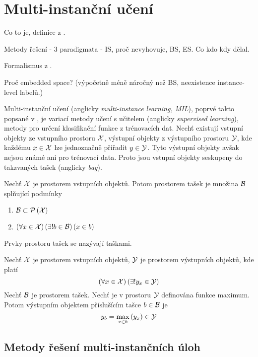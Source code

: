 \chapter{Multi-instanční učení}

Co to je, definice z \cite{dietterich_solving_1997}.

Metody řešení - 3 paradigmata - IS, proč nevyhovuje, BS, ES. Co kdo kdy dělal.

Formalismus z \cite{pevny_using_2016}.

Proč embedded space? (výpočetně méně náročný než BS, neexistence instance-level labelů.)

Multi-instanční učení (anglicky \textenglish{\textit{multi-instance learning, MIL}}), poprvé takto popsané v \cite{dietterich_solving_1997}, je variací metody učení s učitelem (anglicky \textenglish{\textit{supervised learning}}), metody pro určení klasifikační funkce z trénovacích dat. Nechť existují vstupní objekty ze vstupního prostoru \( \mathcal X \), výstupní objekty z výstupního prostoru \( \mathcal Y \), kde každému \( x \in \mathcal X \) lze jednoznačně přiřadit \( y \in \mathcal Y \). Tyto výstupní objekty avšak nejsou známé ani pro trénovací data. Proto jsou vstupní objekty seskupeny do takzvaných tašek (anglicky \textenglish{\textit{bag}}).
\begin{define}
	Nechť \( \mathcal X \) je prostorem vstupních objektů. Potom prostorem tašek je množina \( \mathcal B \) splňující podmínky
	\begin{enumerate}
		\item \( \mathcal B \subset \mathcal P \left( \mathcal X \right) \)
		\item \( \left( \forall x \in \mathcal X \right) \left( \exists ! b \in \mathcal B \right) \left( x \in b \right) \)
	\end{enumerate}
	Prvky prostoru tašek se nazývají taškami.
\end{define}
\begin{define}\label{baglabel}
	Nechť \( \mathcal X \) je prostorem vstupních objektů, \( \mathcal Y \) je prostorem výstupních objektů, kde platí
	\[ \left( \forall x \in \mathcal X \right) \left( \exists ! y_x \in \mathcal Y \right) \]
	Nechť \( \mathcal B \) je prostorem tašek. Nechť je v prostoru \( \mathcal Y \) definována funkce maximum. Potom výstupním objektem příslušícím tašce \( b \in \mathcal B \) je
	\[ y_b = \max_{x \in b} \left( y_x \right) \in \mathcal Y \]
\end{define}

\section{Metody řešení multi-instančních úloh}

